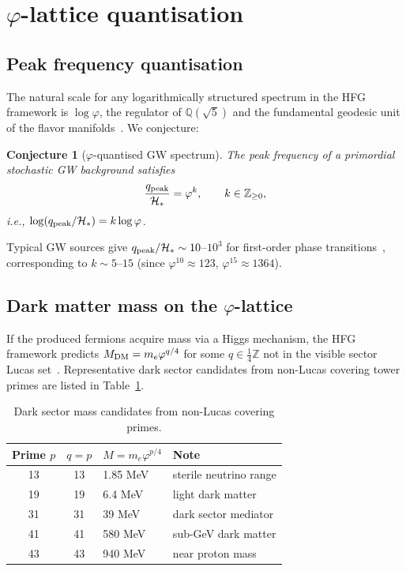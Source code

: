 \documentclass[12pt]{article}
\newtheorem{conjecture}{Conjecture}
\theoremstyle{definition}
\newcommand{\ph}{\varphi}
\newcommand{\Hstar}{\mathcal{H}_*}
\begin{document}
\section{$\ph$-lattice quantisation}

\subsection{Peak frequency quantisation}

The natural scale for any logarithmically structured spectrum in the
HFG framework is $\log\ph$, the regulator of $\mathbb{Q}(\sqrt5)$
and the fundamental geodesic unit of the flavor
manifolds~\cite{Gentry:Lucas}.
We conjecture:

\begin{conjecture}[$\ph$-quantised GW spectrum]
\label{conj:gw}
The peak frequency of a primordial stochastic GW background satisfies
\[
  \frac{q_{\rm peak}}{\Hstar} = \ph^k, \qquad k \in \mathbb{Z}_{\ge 0},
\]
i.e., $\log(q_{\rm peak}/\Hstar) = k\log\ph$.
\end{conjecture}

Typical GW sources give $q_{\rm peak}/\Hstar \sim 10$--$10^3$ for
first-order phase transitions~\cite{Caprini2016}, corresponding to
$k \sim 5$--$15$ (since $\ph^{10}\approx 123$, $\ph^{15}\approx 1364$).

\subsection{Dark matter mass on the $\ph$-lattice}

If the produced fermions acquire mass via a Higgs mechanism, the HFG
framework predicts $M_{\rm DM} = m_e\ph^{q/4}$ for some
$q\in\frac{1}{4}\mathbb{Z}$ not in the visible sector
Lucas set~\cite{Gentry:SU}.
Representative dark sector candidates from non-Lucas covering tower
primes are listed in Table~\ref{tab:dm}.

\begin{table}[htbp]
\centering
\caption{Dark sector mass candidates from non-Lucas covering primes.}
\label{tab:dm}
\begin{tabular}{ccll}
\toprule
Prime $p$ & $q=p$ & $M = m_e\ph^{p/4}$ & Note \\
\midrule
13 & 13 & 1.85 MeV  & sterile neutrino range \\
19 & 19 & 6.4 MeV   & light dark matter \\
31 & 31 & 39 MeV    & dark sector mediator \\
41 & 41 & 580 MeV   & sub-GeV dark matter \\
43 & 43 & 940 MeV   & near proton mass \\
\bottomrule
\end{tabular}
\end{table}
\end{document}
